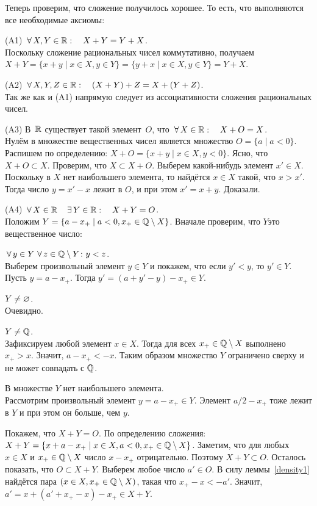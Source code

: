 \documentclass[a4paper,12pt]{article}
\begin{document}
Теперь проверим, что сложение получилось  хорошее. То есть, что выполняются все необходимые аксиомы:
\begin{items}{-3}
\item[(A1)]
$\,\forall\, X,Y\in \mathbb{R}:\quad X+Y=Y+X$.\\
Поскольку сложение рациональных чисел коммутативно, получаем\\ $X + Y = \{x+y \mid x\in X, y\in Y\} = \{y+x \mid x\in X, y\in Y\} = Y + X$.
\item[(A2)]
$\,\forall\, X,Y,Z\in \mathbb{R}:\quad(X+Y)+Z=X+(Y+Z)$.\\
Так же как и (A1) напрямую следует из ассоциативности сложения рациональных чисел.
\item[(A3)]
В~$\mathbb{R}$ существует такой элемент~$O$, что $\,\forall\, X\in \mathbb{R}:\quad X+O=X$.\\
Нулём в множестве вещественных чисел является множество $O = \{a \mid a < 0\}$. Распишем по определению: $X + O = \{x + y\mid x\in X, y < 0\}$. Ясно, что $X+O \subset X$. Проверим, что $X \subset X+O$. Выберем какой-нибудь элемент $x' \in X$. Поскольку в $X$ нет наибольшего элемента, то найдётся $x \in X$ такой, что $x > x'$. Тогда число $y = x' - x$ лежит в $O$, и при этом $x' = x+y$. Доказали.
\item[(A4)]
$\,\forall\, X\in \mathbb{R} \quad \,\exists\, Y\in \mathbb{R}:\quad X+Y=O$.\\
Положим $Y = \{a - x_+ \mid a < 0, x_+\in\mathbb{Q}\setminus X\}$. Вначале проверим, что $Y$\т это вещественное число:
\begin{nums}{-3}
\item
$\,\forall\, y\in Y \, \,\forall\, z \in \mathbb{Q}\setminus Y \colon y < z$.\\
Выберем произвольный элемент $y \in Y$ и покажем, что если $y' < y$, то $y' \in Y$. Пусть $y = a - x_+$. Тогда $y' = (a+y'-y) - x_+ \in Y$.
\item
$Y \ne \varnothing$.\\
Очевидно.
\item
$Y \ne \mathbb{Q}$.\\
Зафиксируем любой элемент $x\in X$. Тогда для всех $x_+ \in \mathbb{Q}\setminus X$ выполнено $x_+ > x$. Значит, $a - x_+ < -x$. Таким образом множество $Y$ ограничено сверху и не может совпадать с $\mathbb{Q}$.
\item
В множестве $Y$ нет наибольшего элемента.\\
Рассмотрим произвольный элемент $y = a-x_+ \in Y$. Элемент $a/2 - x_+$ тоже лежит в $Y$ и при этом он больше, чем $y$.
\end{nums}
Покажем, что $X + Y = O$. По определению сложения: $X+Y = \{x + a - x_+ \mid x\in X, a<0, x_+ \in \mathbb{Q}\setminus X\}$. Заметим, что для любых $x \in X$ и $x_+ \in \mathbb{Q}\setminus X$ число $x - x_+$ отрицательно. Поэтому $X+Y \subset O$. Осталось показать, что $O \subset X+Y$. Выберем любое число $a' \in O$. В силу леммы~\ref{density1} найдётся пара $(x \in X, x_+ \in \mathbb{Q}\setminus X)$, такая что $x_+ - x < -a'$. Значит, $a' = x + (a'+x_+ - x) - x_+ \in X+Y$.
\end{items}
\end{document}
